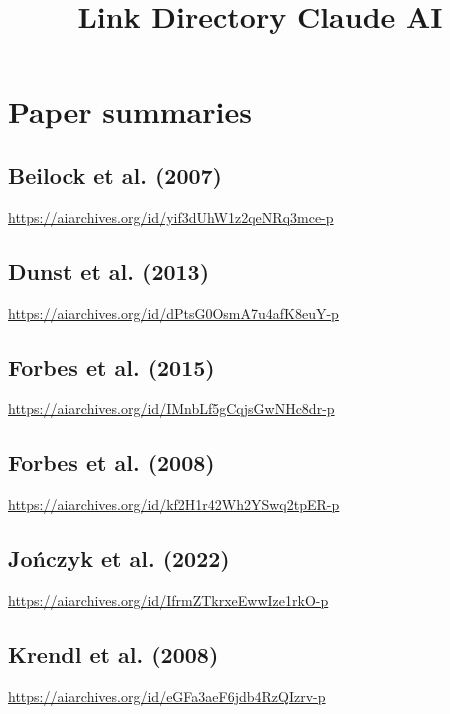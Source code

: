 \documentclass[
  doc, a4paper]{apa7}
\title{Link Directory Claude AI}
\author{\phantom{0}}
\date{}
\affiliation{\phantom{0}}
\begin{document}
\maketitle

\section{Paper summaries}\label{paper-summaries}

\subsection{Beilock et al. (2007)}\label{beilockstereotypethreatworking2007}

\url{https://aiarchives.org/id/yif3dUhW1z2qeNRq3mce-p}

\subsection{Dunst et al. (2013)}\label{dunstsexdifferencesneural2013}

\url{https://aiarchives.org/id/dPtsG0OsmA7u4afK8euY-p}

\subsection{Forbes et al. (2015)}\label{forbesspontaneousdefaultmode2015}

\url{https://aiarchives.org/id/IMnbLf5gCqjsGwNHc8dr-p}

\subsection{Forbes et al. (2008)}\label{forbesroledevaluingdiscounting2008}

\url{https://aiarchives.org/id/kf2H1r42Wh2YSwq2tpER-p}

\subsection{Jończyk et al. (2022)}\label{jonczykhowstereotypethreat2022}

\url{https://aiarchives.org/id/IfrmZTkrxeEwwIze1rkO-p}

\subsection{Krendl et al. (2008)}\label{krendlnegativeconsequencesthreat2008}

\url{https://aiarchives.org/id/eGFa3aeF6jdb4RzQIzrv-p}
\end{document}
